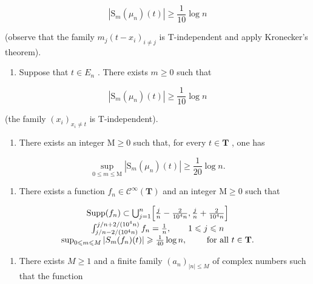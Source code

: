 \[
| \mathrm{S} _ {m} (\mu_ {n}) (t) | \geqslant \frac {1}{1 0} \log n
\]

(observe that the family \(m_{j}(t - x_{i})_{i \neq j}\) is T-independent and apply Kronecker's theorem).

\begin{enumerate}
\def\labelenumi{\alph{enumi})}
\setcounter{enumi}{5}
\tightlist
\item
  Suppose that \(t \in E_{n}\) . There exists \(m \geqslant 0\) such that
\end{enumerate}

\[
| \mathrm{S} _ {m} (\mu_ {n}) (t) | \geqslant \frac {1}{1 0} \log n
\]

(the family \((x_{i})_{x_{i}\neq t}\) is T-independent).

\begin{enumerate}
\def\labelenumi{\alph{enumi})}
\setcounter{enumi}{6}
\tightlist
\item
  There exists an integer \(\mathrm{M} \geqslant 0\) such that, for every \(t \in \mathbf{T}\) , one has
\end{enumerate}

\[
\sup _ {0 \leqslant m \leqslant \mathrm{M}} | \mathrm{S} _ {m} (\mu_ {n}) (t) | \geqslant \frac {1}{2 0} \log n.
\]

\begin{enumerate}
\def\labelenumi{\alph{enumi})}
\setcounter{enumi}{7}
\tightlist
\item
  There exists a function \(f_{n}\in\mathcal{C}^{\infty}(\mathbf{T})\) and an integer \(\mathrm{M}\geqslant0\) such that
\end{enumerate}

\[
\begin{array}{c} \operatorname{Supp} (f _ {n}) \subset \bigcup_ {j = 1} ^ {n} \Bigl [ \frac {j}{n} - \frac {2}{1 0 ^ {4} n}, \frac {j}{n} + \frac {2}{1 0 ^ {4} n} \Bigr ] \\ \int_ {j / n - 2 / (1 0 ^ {4} n)} ^ {j / n + 2 / (1 0 ^ {4} n)} f _ {n} = \frac {1}{n}, \qquad 1 \leqslant j \leqslant n \\ \sup _ {0 \leqslant m \leqslant M} | S _ {m} (f _ {n}) (t) | \geqslant \frac {1}{4 0} \log n, \qquad \text { for all } t \in \mathbf {T}. \end{array}
\]

\begin{enumerate}
\def\labelenumi{\roman{enumi})}
\tightlist
\item
  There exists \(M \geqslant 1\) and a finite family \((a_{n})_{|n| \leqslant M}\) of complex numbers such that the function
\end{enumerate}

